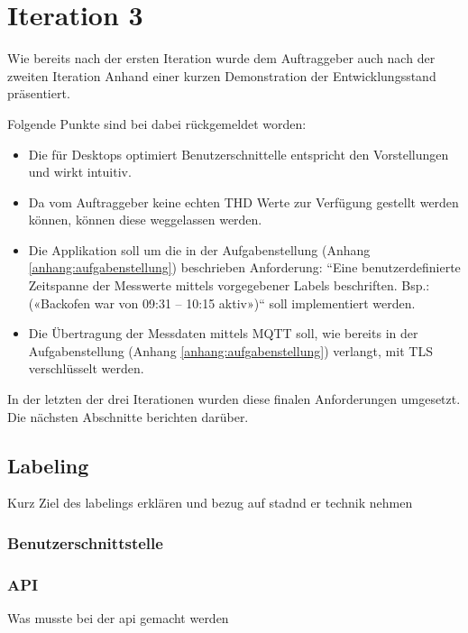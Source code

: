 \section{Iteration 3}
Wie bereits nach der ersten Iteration wurde dem Auftraggeber auch nach der zweiten Iteration
Anhand einer kurzen Demonstration der Entwicklungsstand präsentiert.

Folgende Punkte sind bei dabei rückgemeldet worden:
\begin{itemize}
    \item Die für Desktops optimiert Benutzerschnittelle entspricht den Vorstellungen und wirkt intuitiv.
    \item Da vom Auftraggeber keine echten \ac{THD} Werte zur Verfügung gestellt werden können,
    können diese weggelassen werden.
    \item Die Applikation soll um die in der Aufgabenstellung (Anhang \ref{anhang:aufgabenstellung}) beschrieben Anforderung:
    ``Eine benutzerdefinierte Zeitspanne der Messwerte mittels vorgegebener
    Labels beschriften. Bsp.: («Backofen war von 09:31 – 10:15 aktiv»)`` soll implementiert werden.
    \item Die Übertragung der Messdaten mittels \ac{MQTT} soll,
     wie bereits in der Aufgabenstellung (Anhang \ref{anhang:aufgabenstellung}) verlangt, mit \ac{TLS} verschlüsselt werden.
\end{itemize}
In der letzten der drei Iterationen wurden diese finalen Anforderungen umgesetzt.
Die nächsten Abschnitte berichten darüber.

\subsection{Labeling}
Kurz Ziel des labelings erklären und bezug auf stadnd er technik nehmen

\subsubsection{Benutzerschnittstelle}

\subsubsection{API}
Was musste bei der api gemacht werden

